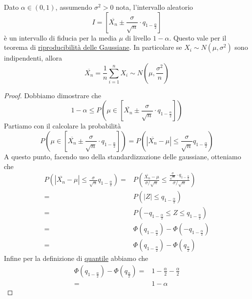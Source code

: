 \begin{proposition}
	Dato $\alpha \in (0,1)$, assumendo $\sigma^2 > 0$ nota, l'intervallo aleatorio
	\[
		I = \left[
			\overline{X_n} \pm \frac{\sigma}{\sqrt{n}} \cdot q_{1 - \frac{\alpha}{2}} \right]
	\]
	è un intervallo di fiducia per la media $\mu$ di livello $1 - \alpha$. Questo vale per il
	teorema di \hyperref[prop: riprod_gauss]{riproducibilità delle Gaussiane}. In particolare se
	$X_i \sim N(\mu, \sigma^2)$ sono indipendenti, allora
	\[ \overline{X_n} = \frac{1}{n} \sum_{i=1}^n X_i \sim N(\mu, \frac{\sigma^2}{n}) \]
	\begin{proof}
		Dobbiamo dimostrare che
		\[
			1 - \alpha \leq P \left( \mu \in \left[ \overline{X_n} \pm
				\frac{\sigma}{\sqrt{n}} \cdot q_{1-\frac{\alpha}{2}} \right] \right)
		\]
		Partiamo con il calcolare la probabilità
		\[
			P \left( \mu \in \left[ \overline{X_n} \pm
				\frac{\sigma}{\sqrt{n}} \cdot q_{1-\frac{\alpha}{2}} \right] \right) =
			P \left( \left| \overline{X_n} - \mu \right| \leq
			\frac{\sigma}{\sqrt{n}} q_{1 - \frac{\alpha}{2}} \right)
		\]
		A questo punto, facendo uso della standardizzazione delle gaussiane, otteniamo che
		\begin{align*}
			P \left( \left| \overline{X_n} - \mu \right| \leq
			\frac{\sigma}{\sqrt{n}} q_{1 - \frac{\alpha}{2}} \right) = &
			P \left( \frac{\overline{X_n} - \mu}{\sigma / \sqrt{n}} \leq
			\frac{\frac{\sigma}{\sqrt{n}} \cdot q_{1-\frac{\alpha}{2}}}{\sigma/\sqrt{n}} \right) \\
			=                                                          &
			P \left( |Z| \leq q_{1 - \frac{\alpha}{2}} \right)                                   \\
			=                                                          &
			P \left( -q_{1 - \frac{\alpha}{2}} \leq Z \leq q_{1-\frac{\alpha}{2}} \right)        \\
			=                                                          &
			\Phi \left( q_{1-\frac{\alpha}{2}} \right) -
			\Phi \left(-q_{1-\frac{\alpha}{2}} \right)                                           \\
			=                                                          &
			\Phi \left( q_{1-\frac{\alpha}{2}} \right) -
			\Phi \left(q_{\frac{\alpha}{2}} \right)
		\end{align*}
		Infine per la definizione di \hyperref[def: quantile]{quantile} abbiamo che
		\begin{align*}
			\Phi \left( q_{1-\frac{\alpha}{2}} \right) -
			\Phi \left(q_{\frac{\alpha}{2}} \right) = & 1 - \frac{\alpha}{2} -
			\frac{\alpha}{2}                                                   \\
			=                                         & 1 - \alpha
		\end{align*}
	\end{proof}
\end{proposition}

